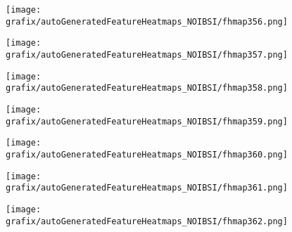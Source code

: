 \begin{subfigure}{\wid\textwidth} 
    \centering 
    \caption{\tiny \sffamily {}} 
    \vspace{\vsp} 
    \texttt{[image: grafix/autoGeneratedFeatureHeatmaps\_NOIBSI/fhmap356.png]} 
\end{subfigure} 
\hspace{\hsp} 
\begin{subfigure}{\wid\textwidth} 
    \centering 
    \caption{\tiny \sffamily {}} 
    \vspace{\vsp} 
    \texttt{[image: grafix/autoGeneratedFeatureHeatmaps\_NOIBSI/fhmap357.png]} 
\end{subfigure} 
\hspace{\hsp} 
\begin{subfigure}{\wid\textwidth} 
    \centering 
    \caption{\tiny \sffamily {}} 
    \vspace{\vsp} 
    \texttt{[image: grafix/autoGeneratedFeatureHeatmaps\_NOIBSI/fhmap358.png]} 
\end{subfigure} 
\hspace{\hsp} 
\begin{subfigure}{\wid\textwidth} 
    \centering 
    \caption{\tiny \sffamily {}} 
    \vspace{\vsp} 
    \texttt{[image: grafix/autoGeneratedFeatureHeatmaps\_NOIBSI/fhmap359.png]} 
\end{subfigure} 
\hspace{\hsp} 
\begin{subfigure}{\wid\textwidth} 
    \centering 
    \caption{\tiny \sffamily {}} 
    \vspace{\vsp} 
    \texttt{[image: grafix/autoGeneratedFeatureHeatmaps\_NOIBSI/fhmap360.png]} 
\end{subfigure} 
\hspace{\hsp} 
\begin{subfigure}{\wid\textwidth} 
    \centering 
    \caption{\tiny \sffamily {}} 
    \vspace{\vsp} 
    \texttt{[image: grafix/autoGeneratedFeatureHeatmaps\_NOIBSI/fhmap361.png]} 
\end{subfigure} 
\hspace{\hsp} 
\begin{subfigure}{\wid\textwidth} 
    \centering 
    \caption{\tiny \sffamily {}} 
    \vspace{\vsp} 
    \texttt{[image: grafix/autoGeneratedFeatureHeatmaps\_NOIBSI/fhmap362.png]} 
\end{subfigure} 
